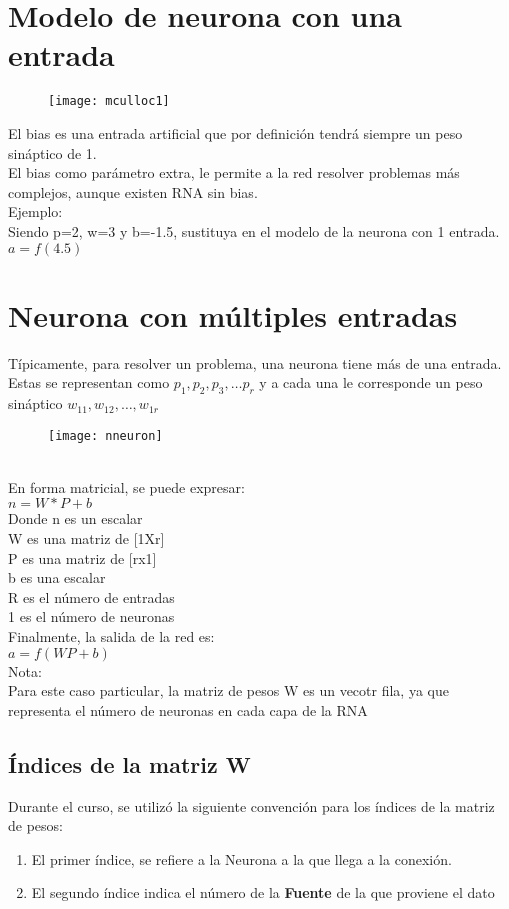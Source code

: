\documentclass{article}
\begin{document}
\section{Modelo de neurona con una entrada}
\begin{figure}[h!]
	\texttt{[image: mculloc1]}
\end{figure}
El bias es una entrada artificial que por definición tendrá siempre un peso sináptico de 1.\\
El bias como parámetro extra, le permite a la red resolver problemas más complejos, aunque existen RNA sin bias.\\
\newpage
Ejemplo:\\
Siendo p=2, w=3 y b=-1.5, sustituya en el modelo de la neurona con 1 entrada.\\
$a = f(4.5)$
\section{Neurona con múltiples entradas}
Típicamente, para resolver un problema, una neurona tiene más de una entrada. Estas se representan como $p_1, p_2, p_3, \ldots p_r$ y a cada una le corresponde un peso sináptico $w_{11}, w_{12}, \ldots, w_{1r}$\\
\begin{figure}[h!]
	\texttt{[image: nneuron]}
\end{figure}\\
En forma matricial, se puede expresar:\\
$n = W*P + b$\\
Donde n es un escalar\\
W es una matriz de [1Xr]\\
P es una matriz de [rx1]\\
b es una escalar\\
R es el número de entradas\\
1 es el número de neuronas\\

Finalmente, la salida de la red es:\\
$a = f(WP + b)$\\
Nota:\\
Para este caso particular, la matriz de pesos W es un vecotr fila, ya que representa el número de neuronas en cada capa de la RNA
\subsection{Índices de la matriz W}
Durante el curso, se utilizó la siguiente convención para los índices de la matriz de pesos:\\
\begin{enumerate}
	\item El primer índice, se refiere a la Neurona a la que llega a la conexión.
	\item El segundo índice indica el número  de la \textbf{Fuente} de la que proviene el dato
\end{enumerate}
\end{document}
